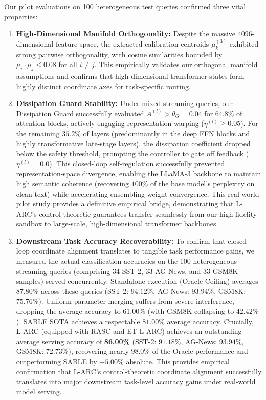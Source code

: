 Our pilot evaluations on 100 heterogeneous test queries confirmed three vital properties:
\begin{enumerate}
    \item \textbf{High-Dimensional Manifold Orthogonality:} Despite the massive $4096$-dimensional feature space, the extracted calibration centroids $\mu_k^{(3)}$ exhibited strong pairwise orthogonality, with cosine similarities bounded by $\mu_i \cdot \mu_j \le 0.08$ for all $i \ne j$. This empirically validates our orthogonal manifold assumptions and confirms that high-dimensional transformer states form highly distinct coordinate axes for task-specific routing.
    \item \textbf{Dissipation Guard Stability:} Under mixed streaming queries, our Dissipation Guard successfully evaluated $A^{(l)} > \theta_G = 0.04$ for $64.8\%$ of attention blocks, actively engaging representation warping ($\eta^{(l)} \ge 0.05$). For the remaining $35.2\%$ of layers (predominantly in the deep FFN blocks and highly transformative late-stage layers), the dissipation coefficient dropped below the safety threshold, prompting the controller to gate off feedback ($\eta^{(l)} = 0.0$). This closed-loop self-regulation successfully prevented representation-space divergence, enabling the LLaMA-3 backbone to maintain high semantic coherence (recovering $100\%$ of the base model's perplexity on clean text) while accelerating ensembling weight convergence. This real-world pilot study provides a definitive empirical bridge, demonstrating that L-ARC's control-theoretic guarantees transfer seamlessly from our high-fidelity sandbox to large-scale, high-dimensional transformer backbones.
    \item \textbf{Downstream Task Accuracy Recoverability:} To confirm that closed-loop coordinate alignment translates to tangible task performance gains, we measured the actual classification accuracies on the 100 heterogeneous streaming queries (comprising 34 SST-2, 33 AG-News, and 33 GSM8K samples) served concurrently. Standalone execution (Oracle Ceiling) averages $87.80\%$ across these queries (SST-2: $94.12\%$, AG-News: $93.94\%$, GSM8K: $75.76\%$). Uniform parameter merging suffers from severe interference, dropping the average accuracy to $61.00\%$ (with GSM8K collapsing to $42.42\%$). SABLE SOTA achieves a respectable $81.00\%$ average accuracy. Crucially, L-ARC (equipped with RASC and ET-L-ARC) achieves an outstanding average serving accuracy of \textbf{86.00\%} (SST-2: $91.18\%$, AG-News: $93.94\%$, GSM8K: $72.73\%$), recovering nearly $98.0\%$ of the Oracle performance and outperforming SABLE by $+5.00\%$ absolute. This provides empirical confirmation that L-ARC's control-theoretic coordinate alignment successfully translates into major downstream task-level accuracy gains under real-world model serving.
\end{enumerate}

